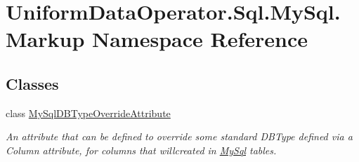 \hypertarget{namespace_uniform_data_operator_1_1_sql_1_1_my_sql_1_1_markup}{}\section{Uniform\+Data\+Operator.\+Sql.\+My\+Sql.\+Markup Namespace Reference}
\label{namespace_uniform_data_operator_1_1_sql_1_1_my_sql_1_1_markup}
\subsection*{Classes}
\begin{DoxyCompactItemize}
\item 
class \mbox{\hyperlink{class_uniform_data_operator_1_1_sql_1_1_my_sql_1_1_markup_1_1_my_sql_d_b_type_override_attribute}{My\+Sql\+D\+B\+Type\+Override\+Attribute}}
\begin{DoxyCompactList}\small\item\em An attribute that can be defined to override some standard {\ttfamily D\+B\+Type} defined via a {\ttfamily Column} attribute, for columns that willcreated in \mbox{\hyperlink{namespace_uniform_data_operator_1_1_sql_1_1_my_sql}{My\+Sql}} tables. \end{DoxyCompactList}\end{DoxyCompactItemize}
